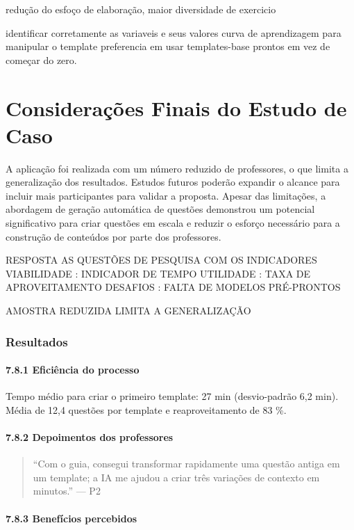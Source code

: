 redução do esfoço de elaboração, maior diversidade de exercicio

identificar corretamente as variaveis e seus valores
curva de aprendizagem para manipular o template
preferencia em usar templates-base prontos em vez de começar do zero.

\section{Considerações Finais do Estudo de Caso}
A aplicação foi realizada com um número reduzido de professores, o que limita a generalização dos resultados. Estudos futuros poderão expandir o alcance para incluir mais participantes para validar a proposta. Apesar das limitações, a abordagem de geração automática de questões demonstrou um potencial significativo para criar questões em escala e reduzir o esforço necessário para a construção de conteúdos por parte dos professores.


RESPOSTA AS QUESTÕES DE PESQUISA COM OS INDICADORES 
VIABILIDADE : INDICADOR DE TEMPO
UTILIDADE : TAXA DE APROVEITAMENTO 
DESAFIOS : FALTA DE MODELOS PRÉ-PRONTOS

AMOSTRA REDUZIDA LIMITA A GENERALIZAÇÃO


\subsubsection{\textbf{Resultados}}

\paragraph{\textbf{7.8.1 Eficiência do processo}}

Tempo médio para criar o primeiro template: 27 min (desvio-padrão 6,2 min). Média de 12,4 questões por template e reaproveitamento de 83 \%.

\paragraph{\textbf{7.8.2 Depoimentos dos professores}}

\begin{quote}
“Com o guia, consegui transformar rapidamente uma questão antiga em um template; a IA me ajudou a criar três variações de contexto em minutos.” — P2

\end{quote}

\paragraph{\textbf{7.8.3 Benefícios percebidos}}

